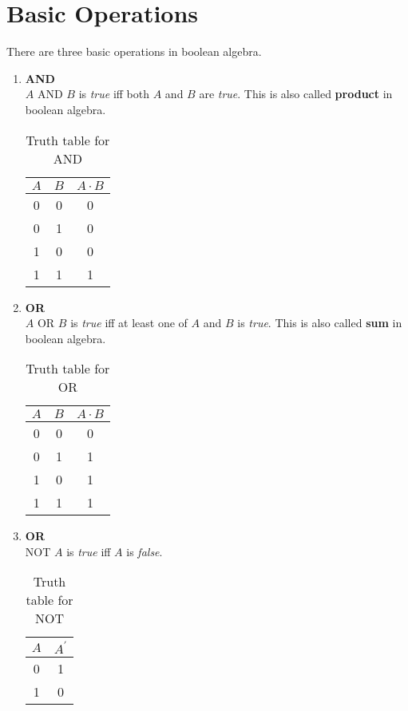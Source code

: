 \documentclass[oneside]{book}
\begin{document}
\section{Basic Operations}
There are three basic operations in boolean algebra.
\begin{enumerate}
	\item \textbf{AND}\\
	      \(A\) {AND} \(B\) is \textit{true} iff both \(A\) and \(B\) are \textit{true}. This is also called \textbf{product} in boolean algebra.
	      \begin{table}[ht]
		      \centering
		      \begin{tabular}{|cc|c|}
			      \hline
			      $A$ & $B$ & $A\cdot B$ \\
			      \hline
			      0   & 0   & 0          \\
			      0   & 1   & 0          \\
			      1   & 0   & 0          \\
			      1   & 1   & 1          \\
			      \hline
		      \end{tabular}
		      \caption{Truth table for AND}
		      \label{truth_table_for_and}
	      \end{table}
	\item \textbf{OR}\\
	      \(A\) {OR} \(B\) is \textit{true} iff at least one of \(A\) and \(B\) is \textit{true}. This is also called \textbf{sum} in boolean algebra.
	      \begin{table}[ht]
		      \centering
		      \begin{tabular}{|cc|c|}
			      \hline
			      $A$ & $B$ & $A\cdot B$ \\
			      \hline
			      0   & 0   & 0          \\
			      0   & 1   & 1          \\
			      1   & 0   & 1          \\
			      1   & 1   & 1          \\
			      \hline
		      \end{tabular}
		      \caption{Truth table for OR}
		      \label{truth_table_for_or}
	      \end{table}
	\item \textbf{OR}\\
	      NOT \(A\) is \textit{true} iff \(A\) is \textit{false}.
	      \begin{table}[ht]
		      \centering
		      \begin{tabular}{|c|c|}
			      \hline
			      $A$ & $A^\prime$ \\
			      \hline
			      0   & 1          \\
			      1   & 0          \\
			      \hline
		      \end{tabular}
		      \caption{Truth table for NOT}
		      \label{truth_table_for_not}
	      \end{table}
\end{enumerate}
\end{document}
